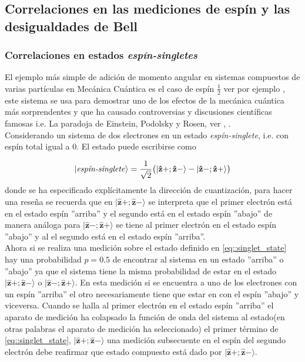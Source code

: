\documentclass[a4paper]{article}
\begin{document}
\subsection{Correlaciones en las mediciones de espín y las desigualdades de Bell}
\subsubsection{Correlaciones en estados \textit{espín-singletes}}
El ejemplo más simple de adición de momento angular en sistemas compuestos de varias partículas en Mecánica Cuántica es el caso de espín $\frac{1}{2}$ ver por ejemplo \cite{Sakurai}, este sistema se usa para demostrar uno de los efectos de la mecánica cuántica más sorprendentes y que ha causado controversias y discusiones científicas famosas i.e. La paradoja de Einstein, Podolsky y Rosen, ver \cite{Einstein}, \cite{Bell}.\\

Considerando un sistema de dos electrones en un estado \textit{espín-singlete}, i.e. con espín total igual a $0$. El estado puede escribirse como 

\begin{equation}\label{eq::singlet_state}
|\text{\textit{espín-singlete}}\rangle=\frac{1}{\sqrt{2}}\big( |\mathbf{\hat{z}}+;\mathbf{\hat{z}}-\rangle -|\mathbf{\hat{z}}-;\mathbf{\hat{z}}+\rangle  \big)
\end{equation}
donde se ha especificado explícitamente la dirección de cuantización, para hacer una reseña se recuerda que en $|\mathbf{\hat{z}}+;\mathbf{\hat{z}}-\rangle$ se interpreta que el primer electrón está en el estado espín ''arriba'' y el segundo está en el estado espín ''abajo'' de manera análoga para $|\mathbf{\hat{z}}-;\mathbf{\hat{z}}+\rangle$ se tiene al primer electrón en el estado espín ''abajo'' y al el segundo está en el estado espín ''arriba''.\\
Ahora si se realiza una medición sobre el estado definido en \ref{eq::singlet_state} hay una probabilidad $p=0.5$ de encontrar al sistema en un estado ''arriba''  o ''abajo'' ya que el sistema tiene la misma probabilidad de estar en el estado $|\mathbf{\hat{z}}+;\mathbf{\hat{z}}-\rangle$ o $|\mathbf{\hat{z}}-;\mathbf{\hat{z}}+\rangle$. En esta medición si se encuentra a uno de los electrones con un espín ''arriba'' el otro necesariamente tiene que estar en con el espín ''abajo'' y viceversa. Cuando se halla al primer electrón en el estado espín ''arriba'' el aparato de medición ha colapsado la función de onda del sistema al estado(en otras palabras el aparato de medición ha seleccionado) el primer término de \ref{eq::singlet_state}, $|\mathbf{\hat{z}}+;\mathbf{\hat{z}}-\rangle$ una medición subsecuente en el espín del segundo electrón debe reafirmar que estado compuesto está dado por $|\mathbf{\hat{z}}+;\mathbf{\hat{z}}-\rangle$.\\
\end{document}
